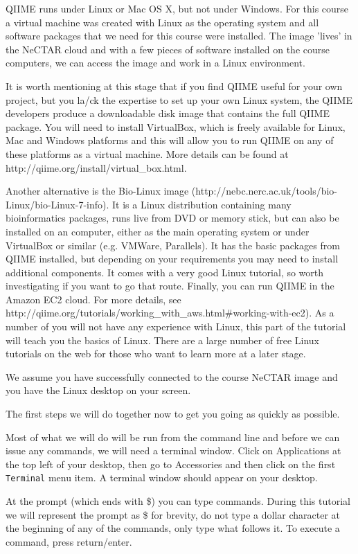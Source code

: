 \documentclass[a4paper,12pt,twoside]{memoir}
\begin{document}
\begin{information}
QIIME runs under Linux or Mac OS X, but not under Windows. For this course a virtual machine was created with Linux as the operating system and all software packages that we need for this course were installed. The image 'lives' in the NeCTAR cloud and with a few pieces of software installed on the course computers, we can access the image and work in a Linux environment. 

It is worth mentioning at this stage that if you find QIIME useful for your own project, but you la/ck the expertise to set up your own Linux system, the QIIME developers produce a downloadable disk image that contains the full QIIME package. You will need to install VirtualBox, which is freely available for Linux, Mac and Windows platforms and this will allow you to run QIIME on any of these platforms as a virtual machine. More details can be found at http://qiime.org/install/virtual\_box.html.

Another alternative is the Bio-Linux image (http://nebc.nerc.ac.uk/tools/bio-Linux/bio-Linux-7-info). It is a Linux distribution containing many bioinformatics packages, runs live from DVD or memory stick, but can also be installed on an computer, either as the main operating system or under VirtualBox or similar (e.g. VMWare, Parallels). It has the basic packages from QIIME installed, but depending on your requirements you may need to install additional components. It comes with a very good Linux tutorial, so worth investigating if you want to go that route. Finally, you can run QIIME in the Amazon EC2 cloud. For more details, see http://qiime.org/tutorials/working\_with\_aws.html\#working-with-ec2).
As a number of you will not have any experience with Linux, this part of the tutorial will teach you the basics of Linux. There are a large number of free Linux tutorials on the web for those who want to learn more at a later stage. 

We assume you have successfully connected to the course NeCTAR image and you have the Linux desktop on your screen.

The first steps we will do together now to get you going as quickly as possible.

Most of what we will do will be run from the command line and before we can issue any commands, we will need a terminal window. Click on Applications at the top left of your desktop, then go to Accessories and then click on the first \texttt{Terminal} menu item. A terminal window should appear on your desktop.

At the prompt (which ends with \$) you can type commands. During this tutorial we will represent the prompt as \$ for brevity, do not type a dollar character at the beginning of any of the commands, only type what follows it. To execute a command, press return/enter.
\end{information}
\end{document}
